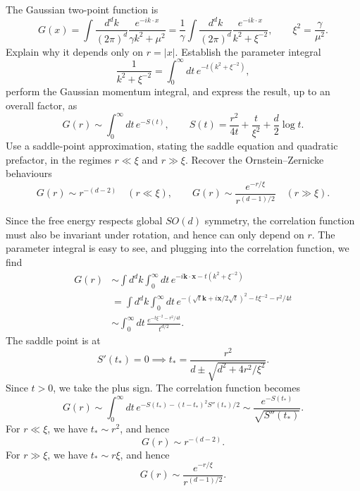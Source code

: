 The Gaussian two-point function is
\begin{equation}
    G(x)=\int\frac{d^dk}{(2\pi)^d}
    \frac{e^{-ik\cdot x}}{\gamma k^2+\mu^2}
    =\frac{1}{\gamma}\int\frac{d^dk}{(2\pi)^d}
    \frac{e^{-ik\cdot x}}{k^2+\xi^{-2}},
    \qquad \xi^2=\frac{\gamma}{\mu^2}.
\end{equation}
Explain why it depends only on $r=|x|$. Establish the parameter integral
\begin{equation}
    \frac{1}{k^2+\xi^{-2}}
    =\int_0^\infty dt\,e^{-t(k^2+\xi^{-2})},
\end{equation}
perform the Gaussian momentum integral, and express the result, up to
an overall factor, as
\begin{equation}
    G(r)\sim\int_0^\infty dt\,e^{-S(t)},
    \qquad S(t)=\frac{r^2}{4t}+\frac{t}{\xi^2}+\frac d2\log t.
\end{equation}
Use a saddle-point approximation, stating the saddle equation and
quadratic prefactor, in the regimes $r\ll\xi$ and $r\gg\xi$.
Recover the Ornstein--Zernicke behaviours
\begin{equation}
    G(r)\sim r^{-(d-2)}\quad(r\ll\xi),
    \qquad
    G(r)\sim\frac{e^{-r/\xi}}{r^{(d-1)/2}}\quad(r\gg\xi).
\end{equation}
\begin{solution}
    Since the free energy respects global $SO(d)$ symmetry, the correlation function must also be invariant under rotation, and hence can only depend on $r$. The parameter integral is easy to see, and plugging into the correlation function, we find
    \begin{equation}
        \begin{aligned}
            G(r) &\sim\int d^dk \int_0^\infty dt \, e^{-i\mathbf{k}\cdot \mathbf{x} - t(k^2 +\xi^{-2})}\\
            &=\int d^dk \int_0^\infty dt \, e^{-(\sqrt{t}\mathbf{k} + i\mathbf{x}/2\sqrt{t})^2 - t\xi^{-2} - r^2/4t}\\
            &\sim\int^\infty_0dt \, \frac{e^{- t\xi^{-2} - r^2/4t}}{t^{d/2}}.
        \end{aligned}
    \end{equation}
    The saddle point is at
    \begin{equation}
        S'(t_*) = 0 \implies t_* = \frac{r^2}{d\pm \sqrt{d^2 + 4r^2/\xi^2}}.
    \end{equation}
    Since $t>0$, we take the plus sign. The correlation function becomes
    \begin{equation}
        G(r) \sim \int^\infty_0 dt \, e^{-S(t_*) - (t-t_*)^2S''(t_*)/2}\sim \frac{e^{-S(t_*)}}{\sqrt{S''(t_*)}}.
    \end{equation}
    For $r\ll \xi$, we have $t_* \sim r^2$, and hence
    \begin{equation}
        G(r) \sim r^{-(d-2)}.
    \end{equation}
    For $r \gg \xi$, we have $t_* \sim r\xi$, and hence
    \begin{equation}
        G(r) \sim \frac{e^{-r/\xi}}{r^{(d-1)/2}}.
    \end{equation}
\end{solution}

